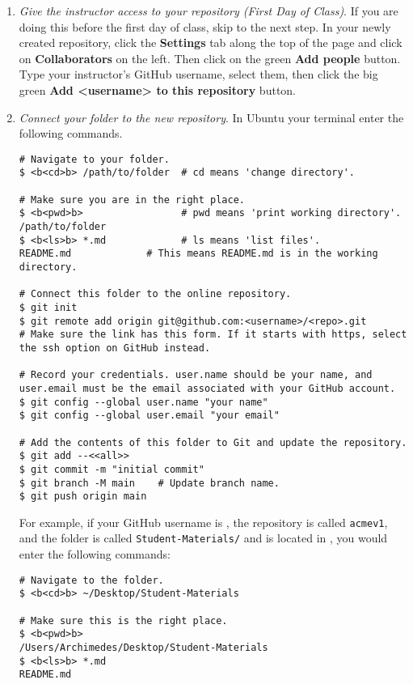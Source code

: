 \begin{enumerate}
    \item \emph{Give the instructor access to your repository (First Day of Class)}.
    If you are doing this before the first day of class, skip to the next step.
    In your newly created repository, click the \textbf{Settings} tab along the top of the page and click on \textbf{Collaborators} on the left.
    Then click on the green \textbf{Add people} button.
    Type your instructor's GitHub username, select them, then click the big green \textbf{Add <username> to this repository} button.

    \item \emph{Connect your folder to the new repository}.
    \label{step:connect-folder}
    In 
    \ifwindows
    Ubuntu
    \else
    your terminal
    \fi 
    enter the following commands.
\begin{lstlisting}
# Navigate to your folder.
$ <b<cd>b> /path/to/folder  # cd means 'change directory'.

# Make sure you are in the right place.
$ <b<pwd>b>                 # pwd means 'print working directory'.
/path/to/folder
$ <b<ls>b> *.md             # ls means 'list files'.
README.md             # This means README.md is in the working directory.

# Connect this folder to the online repository.
$ git init
$ git remote add origin git@github.com:<username>/<repo>.git
# Make sure the link has this form. If it starts with https, select the ssh option on GitHub instead.

# Record your credentials. user.name should be your name, and user.email must be the email associated with your GitHub account.
$ git config --global user.name "your name"
$ git config --global user.email "your email"

# Add the contents of this folder to Git and update the repository.
$ git add --<<all>>
$ git commit -m "initial commit"
$ git branch -M main    # Update branch name.
$ git push origin main
\end{lstlisting}
    
    For example, if your GitHub username is , the repository is called \texttt{acmev1}, and the folder is called \texttt{Student-Materials/} and is located in , you would enter the following commands:
\begin{lstlisting}
# Navigate to the folder.
$ <b<cd>b> ~/Desktop/Student-Materials

# Make sure this is the right place.
$ <b<pwd>b>
/Users/Archimedes/Desktop/Student-Materials
$ <b<ls>b> *.md
README.md


\end{lstlisting}
\end{enumerate}
